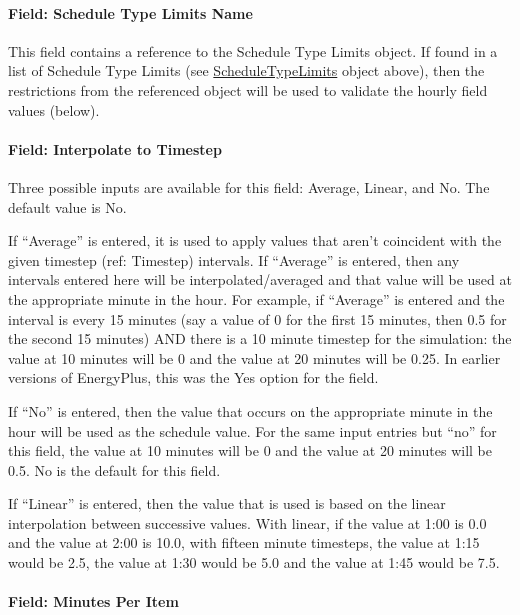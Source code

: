 \paragraph{Field: Schedule Type Limits Name}\label{field-schedule-type-limits-name-2-000}

This field contains a reference to the Schedule Type Limits object. If found in a list of Schedule Type Limits (see \hyperref[scheduletypelimits]{ScheduleTypeLimits} object above), then the restrictions from the referenced object will be used to validate the hourly field values (below).

\paragraph{Field: Interpolate to Timestep}\label{field-interpolate-to-timestep-1}

Three possible inputs are available for this field: Average, Linear, and No. The default value is No.

If ``Average'' is entered, it is used to apply values that aren't coincident with the given timestep (ref: Timestep) intervals. If ``Average'' is entered, then any intervals entered here will be interpolated/averaged and that value will be used at the appropriate minute in the hour. For example, if ``Average'' is entered and the interval is every 15 minutes (say a value of 0 for the first 15 minutes, then 0.5 for the second 15 minutes) AND there is a 10 minute timestep for the simulation: the value at 10 minutes will be 0 and the value at 20 minutes will be 0.25. In earlier versions of EnergyPlus, this was the Yes option for the field.

If ``No'' is entered, then the value that occurs on the appropriate minute in the hour will be used as the schedule value. For the same input entries but ``no'' for this field, the value at 10 minutes will be 0 and the value at 20 minutes will be 0.5. No is the default for this field.

If ``Linear'' is entered, then the value that is used is based on the linear interpolation between successive values. With linear, if the value at 1:00 is 0.0 and the value at 2:00 is 10.0, with fifteen minute timesteps, the value at 1:15 would be 2.5, the value at 1:30 would be 5.0 and the value at 1:45 would be 7.5.

\paragraph{Field: Minutes Per Item}\label{field-minutes-per-item}

